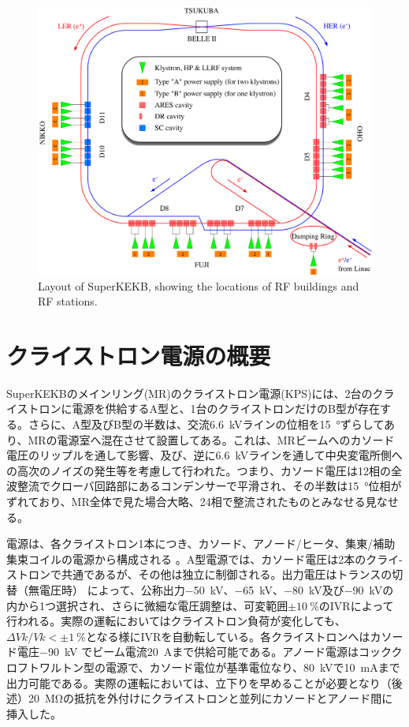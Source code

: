 \documentclass[10pt,a4paper,book,openany]{jlreq}
\theoremstyle{definition}
\begin{document}
\begin{figure}[!htt]
    \begin{center}
        \includegraphics[width=\linewidth]{figs/SKEKB-RF.pdf}
        \caption{Layout of SuperKEKB, showing the locations of RF buildings and RF stations.}
        \label{layout}
    \end{center}
\end{figure}

\section{クライストロン電源の概要}

SuperKEKBのメインリング(MR)のクライストロン電源(KPS)には、2台のクライストロンに電源を供給するA型と、1台のクライストロンだけのB型が存在する。さらに、A型及びB型の半数は、交流\qty{6.6}{\kilo\volt}ラインの位相を\qty{15}{\degree}ずらしてあり、MRの電源室へ混在させて設置してある。これは、MRビームへのカソード電圧のリップルを通して影響、及び、逆に\qty{6.6}{\kilo\volt}ラインを通して中央変電所側への高次のノイズの発生等を考慮して行われた。つまり、カソード電圧は12相の全波整流でクローバ回路部にあるコンデンサーで平滑され、その半数は\qty{15}{\degree}位相がずれており、MR全体で見た場合大略、24相で整流されたものとみなせる見なせる。

電源は、各クライストロン1本につき、カソード、アノード/ヒータ、集東/補助集束コイルの電源から構成される 。A型電源では、カソード電圧は2本のクライ-ストロンで共通であるが、その他は独立に制御される。出力電圧はトランスの切替（無電圧時） によって、公称出力\qty{-50}{\kilo\volt}、\qty{-65}{\kilo\volt}、\qty{-80}{\kilo\volt}及び\qty{-90}{\kilo\volt}の内から1つ選択され、さらに微細な電圧調整は、可変範囲$\pm \qty{10}{\percent}$のIVRによって行われる。実際の運転においてはクライストロン負荷が変化しても、$\Delta Vk/Vk<\pm \qty{1}{\percent}$となる様にIVRを自動転している。各クライストロンへはカソード電庄\qty{-90}{\kilo\volt} でビーム電流\qty{20}{\ampere}まで供給可能である。アノード電源はコッククロフトワルトン型の電源で、カソード電位が基準電位なり、\qty{+80}{\kilo\volt}で\qty{10}{\milli\ampere}まで出力可能である。実際の運転においては、立下りを早めることが必要となり（後述）\qty{20}{\mega\ohm}の抵抗を外付けにクライストロンと並列にカソードとアノード間に挿入した。
\end{document}

